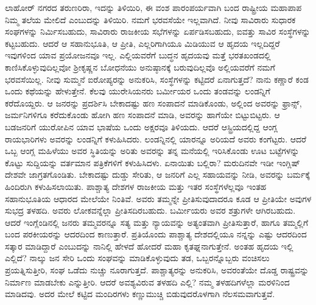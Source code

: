 ಲಾಹೋರ್​ ನಗರದ ತರುಣರಿರಾ, ಇದನ್ನು ತಿಳಿಯಿರಿ, ಈ ವಂಶ ಪಾರಂಪರ್ಯವಾಗಿ ಬಂದ ರಾಷ್ಟ್ರೀಯ ಮಹಾಪಾಪ ನಿಮ್ಮ ತಲೆಯ ಮೇಲಿದೆ ಎಂಬುದನ್ನು ತಿಳಿಯಿರಿ. ನಮಗೆ ಭರವಸೆಯೇ ಇಲ್ಲವಾಗಿದೆ. ನೀವು ಸಾವಿರಾರು ಸುಧಾರಕ ಸಂಘಗಳನ್ನು ನಿರ್ಮಿಸಬಹುದು, ಸಾವಿರಾರು ರಾಜಕೀಯ ಸಭೆಗಳನ್ನು ಏರ್ಪಡಿಸಬಹುದು, ಐವತ್ತು ಸಾವಿರ ಸಂಸ್ಥೆಗಳನ್ನು ಕಟ್ಟಬಹುದು. ಆದರೆ ಆ ಸಹಾನುಭೂತಿ, ಆ ಪ್ರೀತಿ, ಎಲ್ಲರಿಗಾಗಿಯೂ ಮಿಡಿಯುವ ಆ ಹೃದಯ ಇಲ್ಲದಿದ್ದರೆ ಇವುಗಳಿಂದ ಯಾವ ಪ್ರಯೋಜನವೂ ಇಲ್ಲ. ಎಲ್ಲಿಯವರೆಗೆ ಬುದ್ಧನ ಹೃದಯವು ಮತ್ತೆ ಭರತಖಂಡದಲ್ಲಿ ಕಾಣಿಸಿಕೊಳ್ಳುವುದಿಲ್ಲವೋ ಶ‍್ರೀಕೃಷ್ಣನ ಬೋಧನೆಯು ಅನುಷ್ಠಾನಕ್ಕೆ ಬರುವುದಿಲ್ಲವೊ ಅಲ್ಲಿಯವರೆಗೆ ನಮಗೆ ಭರವಸೆಯಿಲ್ಲ. ನೀವು ಸುಮ್ಮನೆ ಐರೋಪ್ಯರನ್ನು ಅನುಕರಿಸಿ, ಸಂಸ್ಥೆಗಳನ್ನು ಕಟ್ಟಿದರೆ ಏನಾಗುತ್ತದೆ? ನಾನು ಕಣ್ಣಾರೆ ಕಂಡ ಒಂದು ಕಥೆಯನ್ನು ಹೇಳುತ್ತೇನೆ. ಕೆಲವು ಯುರೇಸಿಯನರು ಬರ್ಮೀಯರ ಒಂದು ತಂಡವನ್ನು ಲಂಡನ್ನಿಗೆ ಕರೆದೊಯ್ದರು. ಆ ಜನರನ್ನು ಪ್ರದರ್ಶಿಸಿ ಬೇಕಾದಷ್ಟು ಹಣ ಸಂಪಾದನೆ ಮಾಡಿಕೊಂಡು, ಅಲ್ಲಿಂದ ಅವರನ್ನು ಫ್ರಾನ್ಸ್, ಜರ್ಮನಿಗಳಿಗೂ ಕರೆದುಕೊಂಡು ಹೋಗಿ ಹಣ ಸಂಪಾದನೆ ಮಾಡಿ, ಅವರನ್ನು ಹಾಗೆಯೇ ಬಿಟ್ಟುಬಿಟ್ಟರು. ಆ ಬಡಜನರಿಗೆ ಯುರೋಪಿನ ಯಾವ ಭಾಷೆಯ ಒಂದು ಅಕ್ಷರವೂ ತಿಳಿಯದು. ಆದರೆ ಆಸ್ಟ್ರಿಯದಲ್ಲಿದ್ದ ಆಂಗ್ಲ ರಾಯಭಾರಿಗಳು ಅವರನ್ನು ಲಂಡನ್ನಿಗೆ ಕಳುಹಿಸಿದರು. ಲಂಡನ್ನಿನಲ್ಲಿ ಯಾರನ್ನೂ ಅರಿಯದೆ ಅವರು ಕಂಗೆಟ್ಟರು. ಆದರೆ ಒಬ್ಬ ಆಂಗ್ಲ ಮಹಿಳೆಯು ಅವರ ಸ್ಥಿತಿಯನ್ನು ಅರಿತು ಅವರನ್ನು ತನ್ನ ಮನೆಯಲ್ಲಿ ಇರಿಸಿಕೊಂಡು ಊಟ ಬಟ್ಟೆಗಳನ್ನು ಕೊಟ್ಟು ಸುದ್ದಿಯನ್ನು ವರ್ತಮಾನ ಪತ್ರಿಕೆಗಳಿಗೆ ಕಳುಹಿಸಿದಳು. ಏನಾಯಿತು ಬಲ್ಲಿರಾ? ಮರುದಿನವೇ ಇಡೀ ಇಂಗ್ಲಿಷ್​ ದೇಶವೇ ಜಾಗ್ರತಗೊಂಡಿತು. ಬೇಕಾದಷ್ಟು ದುಡ್ಡು ಸೇರಿತು, ಆ ಜನರಿಗೆ ಎಲ್ಲ ಸಹಾಯವನ್ನು ನೀಡಿ, ಅವರನ್ನು ಬರ್ಮಕ್ಕೆ ಹಿಂದಿರುಗಿ ಕಳುಹಿಸಲಾಯಿತು. ಪಾಶ್ಚಾತ್ಯ ದೇಶಗಳ ರಾಜಕೀಯ ಮತ್ತು ಇತರ ಸಂಸ್ಥೆಗಳೆಲ್ಲವೂ ಇಂತಹ ಸಹಾನುಭೂತಿಯ ಆಧಾರದ ಮೇಲೆಯೇ ನಿಂತಿವೆ. ಅವರು ತಮ್ಮನ್ನೇ ಪ್ರೀತಿಸುವುದಾದರೂ ಕೂಡ ಆ ಪ್ರೀತಿಯೇ ಅವುಗಳ ಸುಭದ್ರ ತಳಹದಿ. ಅವರು ಲೋಕವನ್ನೆಲ್ಲಾ ಪ್ರೀತಿಸದಿರಬಹುದು. ಬರ್ಮೀಯರು ಅವರ ಶತ್ರುಗಳೇ ಆಗಿರಬಹುದು. ಆದರೆ ಇಂಗ್ಲೆಂಡಿನಲ್ಲಿ ಜನರು ತಮ್ಮವರನ್ನೂ ಸತ್ಯ ಮತ್ತು ನ್ಯಾಯವನ್ನು ಅತ್ಯಂತವಾಗಿ ಪ್ರೀತಿಸುತ್ತಾರೆ, ಹಾಗೂ ತಮ್ಮಲ್ಲಿಗೆ ಬಂದ ಪರಕೀಯರನ್ನು ಆದರದಿಂದ ಕಾಣುತ್ತಾರೆ. ಪ್ರತಿಯೊಂದು ಪಾಶ್ಚಾತ್ಯ ದೇಶದಲ್ಲಿಯೂ ನನ್ನನ್ನು ಎಷ್ಟು ಆದರದಿಂದ ಸತ್ಕಾರ ಮಾಡಿದ್ದಾರೆ ಎಂಬುದನ್ನು ನಾನಿಲ್ಲಿ ಹೇಳದೆ ಹೋದರೆ ಮಹಾ ಕೃತಘ್ನನಾಗುತ್ತೇನೆ. ಅಂತಹ ಹೃದಯ ಇಲ್ಲಿ ಎಲ್ಲಿದೆ? ನಾಲ್ಕು ಜನ ಸೇರಿ ಒಂದು ಸಂಘವನ್ನು ಮಾಡಿಕೊಳ್ಳುವುದು ತಡ, ಒಬ್ಬರನ್ನೊಬ್ಬರು ವಂಚಿಸಲು ಪ್ರಯತ್ನಿಸುತ್ತೀರಿ, ಸಂಘ ಒಡೆದು ನುಚ್ಚು ನೂರಾಗುತ್ತದೆ. ಪಾಶ್ಚಾತ್ಯರನ್ನು ಅನುಕರಿಸಿ, ಅವರಂತೆಯೇ ದೊಡ್ಡ ರಾಷ್ಟ್ರವನ್ನು ನಿರ್ಮಾಣ ಮಾಡಬೇಕು ಎನ್ನುತ್ತೀರಿ. ಆದರೆ ಅವಶ್ಯವಿರುವ ತಳಹದಿ ಎಲ್ಲಿ? ನಮ್ಮ ತಳಹದಿಗಳೆಲ್ಲಾ ಮರಳಿನಿಂದ ಮಾಡಿದವು. ಅದರ ಮೇಲೆ ಕಟ್ಟಿದ ಮಂದಿರಗಳು ಕಣ್ಣುಮುಚ್ಚಿ ಬಿಡುವುದರೊಳಗಾಗಿ ನೆಲಸಮವಾಗುತ್ತವೆ. 

